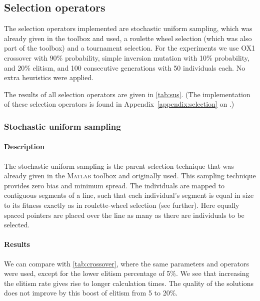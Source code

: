 \documentclass[a4paper,english,11pt,]{scrartcl}
\begin{document}
\subsection{Selection operators}

The selection operators implemented are stochastic uniform sampling, which was already given in the toolbox and used, a roulette wheel selection (which was also part of the toolbox) and a tournament selection. %
For the experiments we use OX1 crossover with 90\% probability, simple inversion mutation with 10\% probability, and 20\% elitism, and 100 consecutive generations with 50 individuals each. No extra heuristics were applied.  

The results of all selection operators are given in \autoref{tab:sus}. (The implementation of these selection operators is found in Appendix~\ref{appendix:selection} on .)
\subsubsection{Stochastic uniform sampling}
\paragraph{Description}
The stochastic uniform sampling is the parent selection technique that was already given in the \textsc{Matlab} toolbox and originally used. 
This sampling technique provides zero bias and minimum spread. The individuals are mapped to contiguous segments of a line, such that each individual's segment is equal in size to its fitness exactly as in roulette-wheel selection (see further). Here equally spaced pointers are placed over the line as many as there are individuals to be selected.



\paragraph{Results}
We can compare with \autoref{tab:crossover}, where the same parameters and operators were used, except for the lower elitism percentage of 5\%. We see that increasing the elitism rate gives rise to longer calculation times. The quality of the solutions does not improve by this boost of elitism from 5 to 20\%. 
\end{document}
